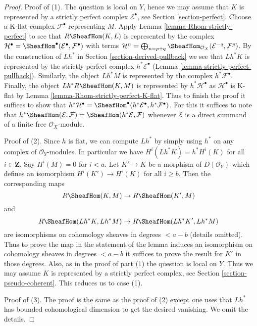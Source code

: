 \begin{proof}
Proof of (1). The question is local on $Y$, hence we may assume that
$K$ is represented by a strictly perfect complex
$\mathcal{E}^\bullet$, see Section \ref{section-perfect}.
Choose a K-flat complex $\mathcal{F}^\bullet$ representing $M$.
Apply Lemma \ref{lemma-Rhom-strictly-perfect} to see that
$R\SheafHom(K, L)$ is represented by the complex
$\mathcal{H}^\bullet =
\SheafHom^\bullet(\mathcal{E}^\bullet, \mathcal{F}^\bullet)$
with terms $\mathcal{H}^n = \bigoplus\nolimits_{n = p + q}
\SheafHom_{\mathcal{O}_X}(\mathcal{E}^{-q}, \mathcal{F}^p)$.
By the construction of $Lh^*$ in Section \ref{section-derived-pullback}
we see that $Lh^*K$ is represented by the strictly perfect complex
$h^*\mathcal{E}^\bullet$ (Lemma \ref{lemma-strictly-perfect-pullback}).
Similarly, the object $Lh^*M$ is represented by
the complex $h^*\mathcal{F}^\bullet$.
Finally, the object $Lh^*R\SheafHom(K, M)$
is represented by $h^*\mathcal{H}^\bullet$ as
$\mathcal{H}^\bullet$ is K-flat by
Lemma \ref{lemma-Rhom-strictly-perfect-K-flat}.
Thus to finish the proof it suffices to show that
$h^*\mathcal{H}^\bullet =
\SheafHom^\bullet(h^*\mathcal{E}^\bullet, h^*\mathcal{F}^\bullet)$.
For this it suffices to note that
$h^*\SheafHom(\mathcal{E}, \mathcal{F}) =
\SheafHom(h^*\mathcal{E}, \mathcal{F})$
whenever $\mathcal{E}$ is a direct summand of a finite free
$\mathcal{O}_X$-module.

\medskip\noindent
Proof of (2). Since $h$ is flat, we can compute $Lh^*$
by simply using $h^*$ on any complex of $\mathcal{O}_Y$-modules.
In particular we have $H^i(Lh^*K) = h^*H^i(K)$ for all $i \in \mathbf{Z}$.
Say $H^i(M) = 0$ for $i < a$. Let $K' \to K$ be a morphism
of $D(\mathcal{O}_Y)$ which defines an isomorphism
$H^i(K') \to H^i(K)$ for all $i \geq b$. Then the corresponding maps
$$
R\SheafHom(K, M) \to R\SheafHom(K', M)
$$
and
$$
R\SheafHom(Lh^*K, Lh^*M) \to R\SheafHom(Lh^*K', Lh^*M)
$$
are isomorphisms on cohomology sheaves in degrees $< a - b$ (details omitted).
Thus to prove the map in the statement of the lemma induces an
isomorphism on cohomology sheaves in degrees $< a - b$ it suffices to
prove the result for $K'$ in those degrees. Also, as in the proof
of part (1) the question is local on $Y$. Thus we may assume $K$ is
represented by a strictly perfect complex, see
Section \ref{section-pseudo-coherent}. This reduces us to case (1).

\medskip\noindent
Proof of (3). The proof is the same as the proof of (2) except one
uses that $Lh^*$ has bounded cohomological dimension to get the
desired vanishing. We omit the details.
\end{proof}

